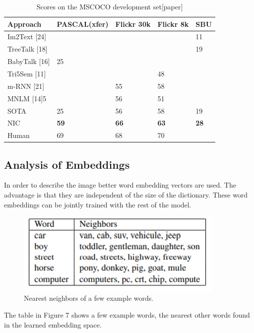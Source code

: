 \documentclass[a4paper,UKenglish,cleveref, autoref, thm-restate]{lipics-v2021}
\begin{document}
\begin{table}
\centering
\begin{tabular}{ |p{3cm}||p{2cm}|p{2cm}|p{2cm}|p{2cm}|}
    \hline
     \centering
     Approach & PASCAL(xfer) & Flickr 30k & Flickr 8k & SBU  \\
     \hline
     \hline
     Im2Text [24] & & & & 11  \\
    TreeTalk [18]   &  & &  & 19 \\
     BabyTalk [16]   &25  &  &  &  \\
      Tri5Sem [11]  &  &  & 48  &  \\
       m-RNN [21]  &  & 55 & 58 &   \\
        MNLM [14]5 &  & 56 & 51 &   \\
        \hline
         SOTA  & 25 & 56 & 58 &19  \\
         \hline
         {NIC} & \textbf{59} & \textbf{66} & \textbf{63} & \textbf{28} \\
         \hline
         Human  & 69 & 68 & 70 & \\
     \hline
\end{tabular}
\caption{Scores on the MSCOCO development set[paper]}
\label{table: MSCOCO Scores}
\end {table}


\subsection{Analysis of Embeddings}
In order to describe the image better word embedding vectors are used. The advantage is that they are independent of the size of the dictionary. These word embeddings can be jointly trained with the rest of the model.
\begin{figure}[ht]
    \centering
    \includegraphics[width=10cm]{images/Word_Embeddings.png}
    \caption{Nearest neighbors of a few example words.}
    \label{fig:}
\end{figure}

The table in Figure 7 shows a few example words, the nearest other words found in the learned embedding space.
\end{document}
